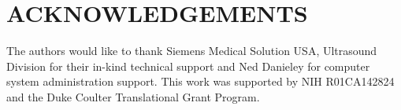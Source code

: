 \section*{ACKNOWLEDGEMENTS}
The authors would like to thank Siemens Medical Solution USA, Ultrasound
Division for their in-kind technical support and Ned Danieley for computer
system administration support.  This work was supported by NIH R01CA142824 and
the Duke Coulter Translational Grant Program.

